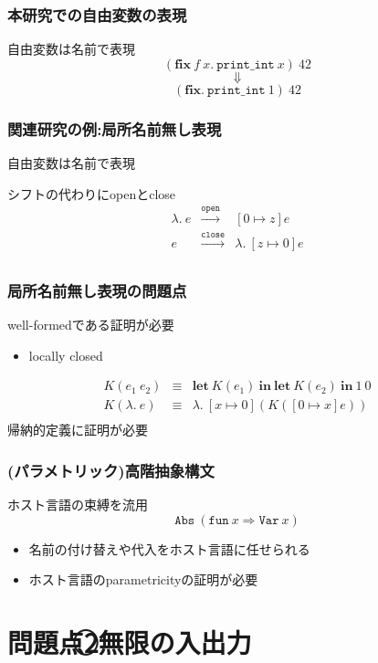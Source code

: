 \documentclass[dvipdfmx,cjk,xcolor=dvipsnames,envcountsect,notheorems,12pt]{beamer}
\theoremstyle{definition}
\newcommand{\keyword}[1]{\mathbf{#1}}
\newcommand{\LET}{\keyword{let}}
\newcommand{\FIX}{\keyword{fix}}
\newcommand{\IN}{\keyword{in}}
\begin{document}
\begin{frame}
	\frametitle{本研究での自由変数の表現}
	\LARGE
	自由変数は名前で表現
	\vfill
	{\LARGE \[(\FIX~f~x.~\texttt{print\_int}~x)~42\]
	\[\Downarrow\]
	\[(\FIX.~\texttt{print\_int}~1)~42\]}
\end{frame}

\begin{frame}
	\frametitle{関連研究の例:局所名前無し表現}
	\LARGE 自由変数は名前で表現

	\vfill 

	シフトの代わりにopenとclose
	\[\begin{array}{lcl}
		\lambda.~e & \xrightarrow{\texttt{open}} & [0 \mapsto z]e \\
		e & \xrightarrow{\texttt{close}} & \lambda.~[z \mapsto 0]e \\
	\end{array}\]
\end{frame}

\begin{frame}
	\frametitle{局所名前無し表現の問題点}
	\LARGE well-formedである証明が必要
	\begin{itemize}
		\item locally closed
	\end{itemize}

	\vfill

	{\large \[\begin{array}{rcl}
		K(e_1~e_2) & \equiv & \LET~ K(e_1)~\IN~\LET~K(e_2)~\IN~1~0 \\
		K(\lambda.~e) & \equiv & \lambda.~[x\mapsto 0](K([0\mapsto x]e)) \\
	\end{array}\]}
	帰納的定義に証明が必要
\end{frame}

\begin{frame}
	\frametitle{(パラメトリック)高階抽象構文}
	\LARGE
	ホスト言語の束縛を流用
	\[\texttt{Abs}~(\texttt{fun}~x \Rightarrow \texttt{Var}~x)\]

	\begin{itemize}
		\item 名前の付け替えや代入をホスト言語に任せられる
		\item ホスト言語のparametricityの証明が必要
	\end{itemize}
\end{frame}

\section{問題点\textcircled{\footnotesize 2}無限の入出力}
\end{document}

